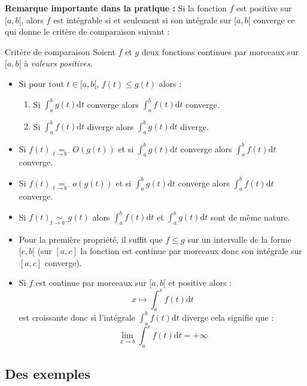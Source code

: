 \documentclass[french,11pt,twoside]{VcCours}
\newcommand{\dt}{\text{d}t}
\begin{document}
\textbf{Remarque importante dans la pratique :} Si la fonction $f$ est positive sur $[a,b[$, alors $f$ est intégrable si et seulement si son intégrale sur $[a,b[$ converge ce qui donne le critère de comparaison suivant :

\begin{Theoreme}{Critère de comparaison} Soient $f$ et $g$ deux fonctions continues par morceaux sur $[a,b[$ à \emph{valeurs positives}.

\begin{itemize}
\item Si pour tout $t \in [a,b[$, $f(t) \leq g(t)$ alors :

\begin{enumerate}
\item Si $ \int_{a}^{b} g(t) \dt$ converge alors $ \int_{a}^{b} f(t) \dt$ converge.
\item Si $ \int_{a}^{b} f(t) \dt$ diverge alors $ \int_{a}^{b} g(t) \dt$ diverge.
\end{enumerate}
\item Si $f(t) \underset{ t \rightarrow b^{-}}{=} O(g(t))$ et si $ \int_{a}^{b} g(t) \dt$ converge alors $ \int_{a}^{b} f(t) \dt$ converge.
\item Si $f(t) \underset{ t \rightarrow b^{-}}{=} o(g(t))  $ et si $ \int_{a}^{b} g(t) \dt$ converge alors $ \int_{a}^{b} f(t) \dt$ converge.
\item Si $f(t) \underset{ t \rightarrow b^{-}}{\sim}g(t)$ alors $\int_{a}^{b} f(t) \dt$ et $\int_{a}^{b} g(t) \dt$ sont de même nature.
\end{itemize}
\end{Theoreme}

\begin{Remarques}{}
\begin{itemize}
\item Pour la première propriété, il suffit que $f \leq g$ sur un intervalle de la forme $[c,b[$ (sur $[a,c]$ la fonction est continue par morceaux donc son intégrale sur $[a,c]$ converge).
\item Si $f$ est continue par morceaux sur $[a,b[$ et positive alors :
$$ x \mapsto \int_{a}^x f(t) \dt$$
est croissante donc si l'intégrale $\int_{a}^{b} f(t) \dt$ diverge cela signifie que :
$$ \lim_{x \rightarrow b} \int_{a}^x f(t) \dt = + \infty$$
\end{itemize}
\end{Remarques}{}

\subsection{Des exemples}
\end{document}
